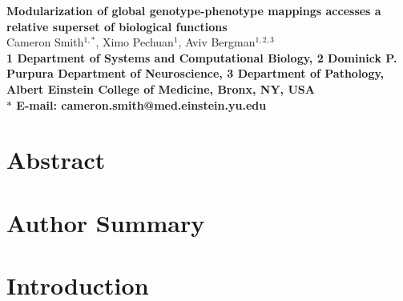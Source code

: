 



\let\ref\autoref

{}
\tableofcontents
\listoffigures
\listoftables
\pagebreak
{}

\begin{flushleft}
{\Large
\textbf{Modularization of global genotype-phenotype mappings accesses a relative superset of biological functions}
}
\\
Cameron Smith$^{1, \ast}$,
Ximo Pechuan$^{1}$,
Aviv Bergman$^{1,2,3}$
\\
\bf{1} Department of Systems and Computational Biology,
\bf{2} Dominick P. Purpura Department of Neuroscience,
\bf{3} Department of Pathology, Albert Einstein College of Medicine, Bronx, NY, USA
\\
$\ast$ E-mail: cameron.smith@med.einstein.yu.edu
\end{flushleft}

\section{Abstract}


\section{Author Summary}


\section{Introduction}


